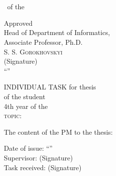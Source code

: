 \begin{titlepage}
\singlespacing
    \begin{center}
        \centering
        \large{\mon}\\
        \textbf{\university}\\
        \department \ of the \faculty\\
        \vspace{25px}
        \begin{flushright}
            Approved\\
            Head of Department of Informatics,\\
            Associate Professor, Ph.D.\\
            S. S. \textsc{Gorokhovskyi}\\
            \vspace{10px}
            \underline{\hspace{140px}} \hspace{1px} (Signature)\\
            \vspace{10px}
            \enquote{\underline{\hspace{25px}}} \underline{\hspace{150px}} \thesisyear
        \end{flushright}

    \vspace{25px}
    INDIVIDUAL TASK
    for thesis\\
    of the student \authorname\\
    4th year of the \faculty\\
    \textsc{topic:}\ \thesistitle

    \vspace{25px}
    \begin{flushleft}
        The content of the PM to the thesis:\\
        \PMcontents
    \end{flushleft}

    \vfill
        \begin{flushright}
        Date of issue:
        \enquote{\underline{\hspace{25px}}} \underline{\hspace{100px}} \hspace{1px} \thesisyear\\
        \vspace{20px}
        Supervisor:
        \underline{\hspace{100px}} \hspace{1px} (Signature)\\
        \vspace{10px}
        Task received:
        \underline{\hspace{100px}} \hspace{1px} (Signature)\\
        \end{flushright}
    \end{center}
\end{titlepage}

